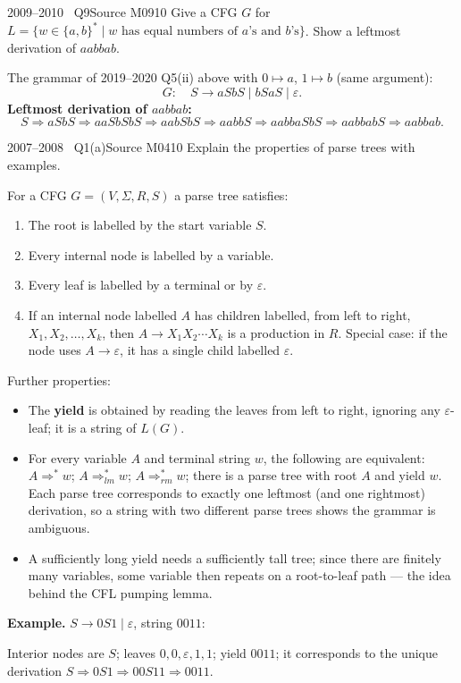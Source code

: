 \documentclass[11pt,a4paper]{article}
\newcommand{\eps}{\varepsilon}
\newcommand{\fig}[1]{\par\smallskip\begin{center}\adjustbox{max width=\linewidth}{#1}\end{center}\vspace{-2pt}}
\begin{document}
\begin{question}{2009--2010 \textbullet\ Q9}{Source M09}{10}
Give a CFG $G$ for $L=\{w\in\{a,b\}^*\mid w \text{ has equal numbers of } a\text{'s and } b\text{'s}\}$. Show a leftmost derivation of $aabbab$.
\end{question}
\begin{solution}
The grammar of 2019--2020 Q5(ii) above with $0\mapsto a$, $1\mapsto b$ (same argument):
\[ G:\quad S\to aSbS\mid bSaS\mid\eps. \]
\textbf{Leftmost derivation of $aabbab$:}
\[ S\Rightarrow aSbS\Rightarrow aaSbSbS\Rightarrow aabSbS\Rightarrow aabbS\Rightarrow aabbaSbS\Rightarrow aabbabS\Rightarrow aabbab. \]
\end{solution}

\begin{question}{2007--2008 \textbullet\ Q1(a)}{Source M04}{10}
Explain the properties of parse trees with examples.
\end{question}
\begin{solution}
For a CFG $G=(V,\Sigma,R,S)$ a parse tree satisfies:
\begin{enumerate}
\item The root is labelled by the start variable $S$.
\item Every internal node is labelled by a variable.
\item Every leaf is labelled by a terminal or by $\eps$.
\item If an internal node labelled $A$ has children labelled, from left to right, $X_1,X_2,\dots,X_k$, then $A\to X_1X_2\cdots X_k$ is a production in $R$. Special case: if the node uses $A\to\eps$, it has a single child labelled $\eps$.
\end{enumerate}
Further properties:
\begin{itemize}
\item The \textbf{yield} is obtained by reading the leaves from left to right, ignoring any $\eps$-leaf; it is a string of $L(G)$.
\item For every variable $A$ and terminal string $w$, the following are equivalent: $A\Rightarrow^*w$; $A\Rightarrow^*_{lm}w$; $A\Rightarrow^*_{rm}w$; there is a parse tree with root $A$ and yield $w$. Each parse tree corresponds to exactly one leftmost (and one rightmost) derivation, so a string with two different parse trees shows the grammar is ambiguous.
\item A sufficiently long yield needs a sufficiently tall tree; since there are finitely many variables, some variable then repeats on a root-to-leaf path --- the idea behind the CFL pumping lemma.
\end{itemize}
\textbf{Example.} $S\to0S1\mid\eps$, string $0011$:
\fig{\begin{forest}pt [$S$ [0] [$S$ [0] [$S$ [$\eps$]] [1]] [1]]\end{forest}}
Interior nodes are $S$; leaves $0,0,\eps,1,1$; yield $0011$; it corresponds to the unique derivation $S\Rightarrow0S1\Rightarrow00S11\Rightarrow0011$.
\end{solution}
\end{document}
